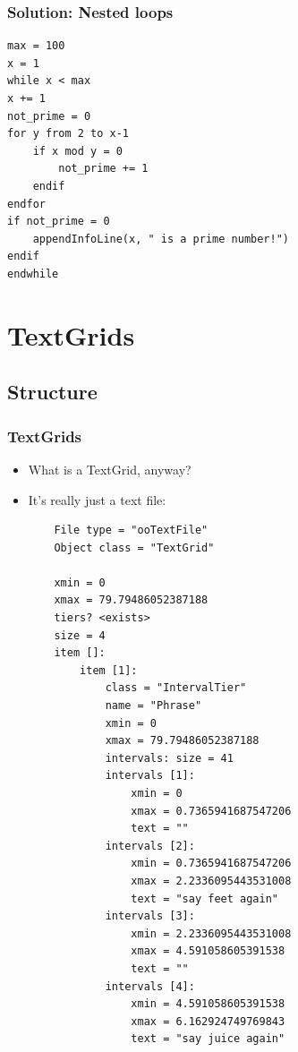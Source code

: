\documentclass[handout]{beamer}
\begin{document}
\begin{frame}[fragile]
\frametitle{Solution: Nested loops}
\begin{verbatim}
max = 100
x = 1
while x < max
x += 1
not_prime = 0
for y from 2 to x-1
    if x mod y = 0
        not_prime += 1
    endif
endfor
if not_prime = 0
    appendInfoLine(x, " is a prime number!")
endif
endwhile
\end{verbatim}
\end{frame}

\section{TextGrids}
\subsection{Structure}

\begin{frame}[fragile]
\frametitle{TextGrids}

\begin{itemize}
    \item <1-> What is a TextGrid, anyway?
    \item <2-> It's really just a text file:
    \scriptsize
    \begin{verbatim}
    File type = "ooTextFile"
    Object class = "TextGrid"

    xmin = 0 
    xmax = 79.79486052387188 
    tiers? <exists> 
    size = 4 
    item []: 
        item [1]:
            class = "IntervalTier" 
            name = "Phrase" 
            xmin = 0 
            xmax = 79.79486052387188 
            intervals: size = 41 
            intervals [1]:
                xmin = 0 
                xmax = 0.7365941687547206 
                text = "" 
            intervals [2]:
                xmin = 0.7365941687547206 
                xmax = 2.2336095443531008 
                text = "say feet again" 
            intervals [3]:
                xmin = 2.2336095443531008 
                xmax = 4.591058605391538 
                text = "" 
            intervals [4]:
                xmin = 4.591058605391538 
                xmax = 6.162924749769843 
                text = "say juice again" 
    \end{verbatim}
\end{itemize}
\end{frame}
\end{document}
